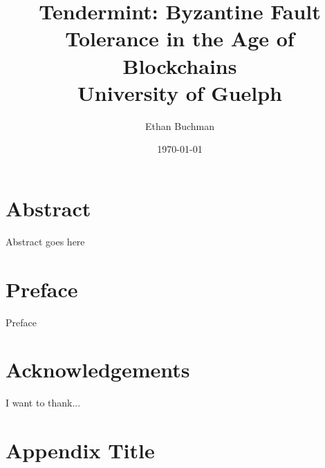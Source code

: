 \documentclass[12pt]{report}
\begin{document}
\title{
	{Tendermint: Byzantine Fault Tolerance in the Age of Blockchains}\\
	{\large University of Guelph}\\
}

\author{Ethan Buchman}
\date{\today}

\maketitle


\chapter*{Abstract}
Abstract goes here

\chapter*{Preface}
Preface

\chapter*{Acknowledgements}
I want to thank...

\tableofcontents
\listoffigures
\listoftables
{}















\appendix
\chapter{Appendix Title}

\end{document}
